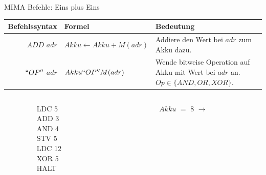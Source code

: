 \documentclass[handout]{beamer}
\begin{document}
\begin{frame}{MIMA Befehle: Eins plus Eins}
	\begin{tabular}{r | l p{5cm} }
		Befehlssyntax & Formel & Bedeutung\\\hline\hline 
		$ADD$ $adr$ & $Akku \leftarrow Akku + M(adr)$ & Addiere den Wert bei $adr$ zum Akku dazu.\\\hline
		$``OP''$ $adr$ & $Akku ``OP'' M(adr)$ & Wende bitweise Operation auf Akku mit Wert bei $adr$ an. $Op \in \{AND, OR, XOR\}$.
	\end{tabular}
	
	\bp 
	\vspace{.2cm}
	\vspace{.2cm}
	
	\begin{columns}
        \begin{column}{0.06\textwidth}
        \end{column}

		\begin{column}{0.15\textwidth}
			LDC 5 \\ ADD 3 \\ AND 4 \\ STV 5 \\ LDC 12 \\ XOR 5 \\ HALT
		\end{column}

        \vline
        \begin{column}{0.02\textwidth}
        \end{column}
		
		\begin{column}{0.24\textwidth}
			\begin{memory}
			\end{memory}
		\end{column}
		\begin{column}{0.05\textwidth}
            $Akku$ $=$ $8$
            \vspace{.3cm}
            $\rightarrow$
		\end{column}
		\begin{column}{0.3\textwidth}
			\begin{memory}
				\memrow{$3$}{$3$}	
				\memrow{$4$}{$8$}
				\memrow{$5$}{$8$}
			\end{memory}
		\end{column}
	\end{columns}
\end{frame}
\end{document}
